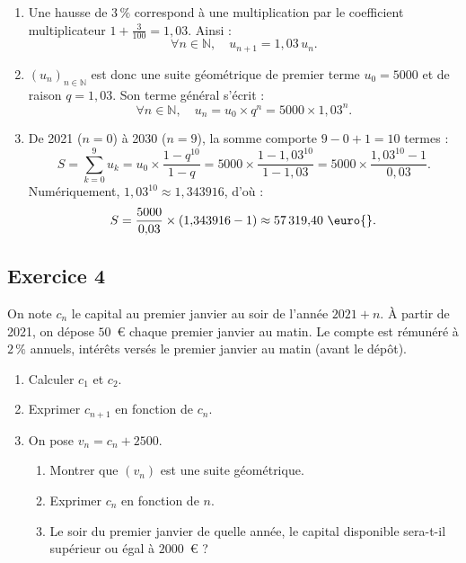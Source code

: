 \documentclass[11pt,a4paper]{article}
\newcommand{\N}{\mathbb{N}}
\begin{document}
\begin{correctionbox}
\begin{enumerate}
    \item Une hausse de $3\,\%$ correspond à une multiplication par le coefficient multiplicateur $1 + \frac{3}{100} = 1{,}03$. Ainsi :
    \[
    \forall n \in \N, \quad u_{n+1} = 1{,}03 \, u_n.
    \]
    \item $(u_n)_{n \in \N}$ est donc une suite géométrique de premier terme $u_0 = 5000$ et de raison $q = 1{,}03$. Son terme général s'écrit :
    \[
    \forall n \in \N, \quad u_n = u_0 \times q^n = 5000 \times 1{,}03^n.
    \]
    \item De 2021 ($n=0$) à 2030 ($n=9$), la somme comporte $9 - 0 + 1 = 10$ termes :
    \[
    S = \sum_{k=0}^9 u_k = u_0 \times \frac{1 - q^{10}}{1 - q} = 5000 \times \frac{1 - 1{,}03^{10}}{1 - 1{,}03} = 5000 \times \frac{1{,}03^{10} - 1}{0{,}03}.
    \]
    Numériquement, $1{,}03^{10} \approx 1{,}343916$, d'où :
    \[
    S = \frac{5000}{0{,}03} \times (1{,}343916 - 1) \approx 57\,319{,}40\text{~\euro{}}.
    \]
\end{enumerate}
\end{correctionbox}

\subsection*{Exercice 4}
On note $c_n$ le capital au premier janvier au soir de l'année $2021 + n$. À partir de 2021, on dépose $50$~\euro{} chaque premier janvier au matin. Le compte est rémunéré à $2\,\%$ annuels, intérêts versés le premier janvier au matin (avant le dépôt).
\begin{enumerate}
    \item Calculer $c_1$ et $c_2$.
    \item Exprimer $c_{n+1}$ en fonction de $c_n$.
    \item On pose $v_n = c_n + 2500$.
    \begin{enumerate}
        \item Montrer que $(v_n)$ est une suite géométrique.
        \item Exprimer $c_n$ en fonction de $n$.
        \item Le soir du premier janvier de quelle année, le capital disponible sera-t-il supérieur ou égal à $2000$~\euro{} ?
    \end{enumerate}
\end{enumerate}
\end{document}
